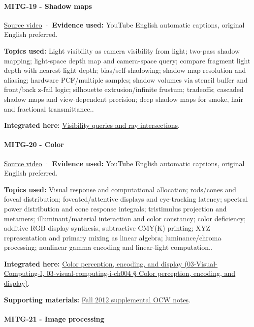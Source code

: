 \paragraph{MITG-19 - Shadow maps}\label{mitg-19---shadow-maps}

\href{https://www.youtube.com/watch?v=jDw_EbXv-1I}{Source video} · \textbf{Evidence used:} YouTube English automatic captions, original English preferred.

\textbf{Topics used:} Light visibility as camera visibility from light; two-pass shadow mapping; light-space depth map and camera-space query; compare fragment light depth with nearest light depth; bias/self-shadowing; shadow map resolution and aliasing; hardware PCF/multiple samples; shadow volumes via stencil buffer and front/back z-fail logic; silhouette extrusion/infinite frustum; tradeoffs; cascaded shadow maps and view-dependent precision; deep shadow maps for smoke, hair and fractional transmittance..

\textbf{Integrated here:} \hyperref[04-visual-computing-ii-ch028]{Visibility queries and ray intersections}.

\paragraph{MITG-20 - Color}\label{mitg-20---color}

\href{https://www.youtube.com/watch?v=aIVVBZ7cJBc}{Source video} · \textbf{Evidence used:} YouTube English automatic captions, original English preferred.

\textbf{Topics used:} Visual response and computational allocation; rods/cones and foveal distribution; foveated/attentive displays and eye-tracking latency; spectral power distribution and cone response integrals; tristimulus projection and metamers; illuminant/material interaction and color constancy; color deficiency; additive RGB display synthesis, subtractive CMY(K) printing; XYZ representation and primary mixing as linear algebra; luminance/chroma processing; nonlinear gamma encoding and linear-light computation..

\textbf{Integrated here:} \href{}{Color perception, encoding, and display (03-Visual-Computing-I, 03-visual-computing-i-ch004 § Color perception, encoding, and display)}.

\textbf{Supporting materials:} \href{https://ocw.mit.edu/courses/6-837-computer-graphics-fall-2012/pages/lecture-notes/}{Fall 2012 supplemental OCW notes}.

\paragraph{MITG-21 - Image processing}\label{mitg-21---image-processing}

